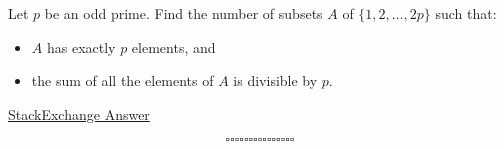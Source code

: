 \documentclass[12pt]{exam}
\begin{document}
\begin{questions}
\question Let $p$ be an odd prime. Find the number of subsets $A$ of $\{1,2, \ldots, 2 p\}$ such that:
\begin{itemize}

\item $A$ has exactly $p$ elements, and

\item the sum of all the elements of $A$ is divisible by $p$.
\end{itemize}

\begin{solution}
\href{https://math.stackexchange.com/questions/314788/let-p-be-an-odd-prime-number-how-many-p-element-subsets-of-1-2-3-4-ldo}{StackExchange Answer}
\end{solution}
\end{questions}

$$\square \square \square \square \square \square \square \square \square \square \square \square \square \square \square $$
\end{document}
